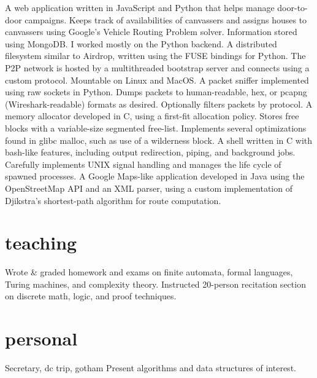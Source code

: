 \documentclass{cv}
\begin{document}
\begin{entrylist}
    {A web application written in JavaScript and Python that helps manage door-to-door campaigns. Keeps track of availabilities of canvassers and assigns houses to canvassers using Google's Vehicle Routing Problem solver. Information stored using MongoDB. I worked mostly on the Python backend.}
    {A distributed filesystem similar to Airdrop, written using the FUSE bindings for Python. The P2P network is hosted by a multithreaded bootstrap server and connects using a custom protocol. Mountable on Linux and MacOS.}
    {A packet sniffer implemented using raw sockets in Python. Dumps packets to human-readable, hex, or pcapng (Wireshark-readable) formats as desired. Optionally filters packets by protocol.}
    {A memory allocator developed in C, using a first-fit allocation policy. Stores free blocks with a variable-size segmented free-list. Implements several optimizations found in glibc malloc, such as use of a wilderness block.}
    {A shell written in C with bash-like features, including output redirection, piping, and background jobs. Carefully implements UNIX signal handling and manages the life cycle of spawned processes.}
    {A Google Maps-like application developed in Java using the OpenStreetMap API and an XML parser, using a custom implementation of Djikstra's shortest-path algorithm for route computation.}
\end{entrylist}

\section{teaching}

\begin{entrylist}
    {Wrote \& graded homework and exams on finite automata, formal languages, Turing machines, and complexity theory.}
    {Instructed 20-person recitation section on discrete math, logic, and proof techniques.}
\end{entrylist}

\section{personal}

\begin{entrylist}
  {Secretary, dc trip, gotham
  }
  {Present algorithms and data structures of interest.
  } 
\end{entrylist}
\end{document}
